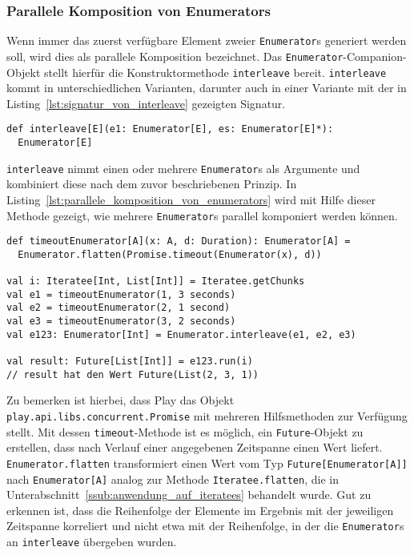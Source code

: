 
\subsubsection{Parallele Komposition von Enumerators} %
\label{ssub:anwendung_parallele_komposition_von_enumerators}

Wenn immer das zuerst verfügbare Element zweier \lstinline|Enumerator|s generiert werden soll, wird dies als parallele Komposition bezeichnet.
Das \lstinline|Enumerator|-Companion-Objekt stellt hierfür die Konstruktormethode \lstinline|interleave| bereit.
\lstinline|interleave| kommt in unterschiedlichen Varianten, darunter auch in einer Variante mit der in Listing~\ref{lst:signatur_von_interleave} gezeigten Signatur.

\begin{lstlisting}[caption=Die Signatur von interleave, label=lst:signatur_von_interleave]
def interleave[E](e1: Enumerator[E], es: Enumerator[E]*):
  Enumerator[E]
\end{lstlisting}

\lstinline|interleave| nimmt einen oder mehrere \lstinline|Enumerator|s als Argumente und kombiniert diese nach dem zuvor beschriebenen Prinzip.
In Listing~\ref{lst:parallele_komposition_von_enumerators} wird mit Hilfe dieser Methode gezeigt, wie mehrere \lstinline|Enumerator|s parallel komponiert werden können.

\begin{lstlisting}[caption=Parallele Komposition von Enumerators, label=lst:parallele_komposition_von_enumerators]
def timeoutEnumerator[A](x: A, d: Duration): Enumerator[A] =
  Enumerator.flatten(Promise.timeout(Enumerator(x), d))

val i: Iteratee[Int, List[Int]] = Iteratee.getChunks
val e1 = timeoutEnumerator(1, 3 seconds)
val e2 = timeoutEnumerator(2, 1 second)
val e3 = timeoutEnumerator(3, 2 seconds)
val e123: Enumerator[Int] = Enumerator.interleave(e1, e2, e3)

val result: Future[List[Int]] = e123.run(i)
// result hat den Wert Future(List(2, 3, 1))
\end{lstlisting}

Zu bemerken ist hierbei, dass Play das Objekt \lstinline|play.api.libs.concurrent.Promise| mit mehreren Hilfsmethoden zur Verfügung stellt.
Mit dessen \lstinline|timeout|-Methode ist es möglich, ein \lstinline|Future|-Objekt zu erstellen, dass nach Verlauf einer angegebenen Zeitspanne einen Wert liefert.
\lstinline|Enumerator.flatten| transformiert einen Wert vom Typ \lstinline|Future[Enumerator[A]]| nach \lstinline|Enumerator[A]| analog zur Methode \lstinline|Iteratee.flatten|, die in Unterabschnitt~\ref{ssub:anwendung_auf_iteratees} behandelt wurde.
Gut zu erkennen ist, dass die Reihenfolge der Elemente im Ergebnis mit der jeweiligen Zeitspanne korreliert und nicht etwa mit der Reihenfolge, in der die \lstinline|Enumerator|s an \lstinline|interleave| übergeben wurden.

